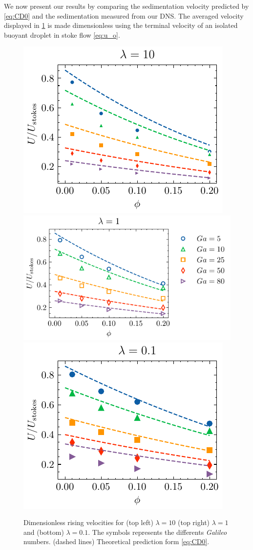 We now present our results by comparing the sedimentation velocity predicted by \ref{eq:CD0} and the sedimentation measured from our DNS. 
The averaged velocity displayed in \ref{fig:drag_force} is made dimensionless using the terminal velocity of an isolated buoyant droplet in stoke flow \eqref{eq:u_o}. 
\begin{figure}[h!]
    \centering
    \includegraphics[height = 0.25\textwidth]{image/HOMOGENEOUS_final/CA/U_l_10.pdf}
    \includegraphics[height = 0.25\textwidth]{image/HOMOGENEOUS_final/CA/U_l_1.pdf}
    \includegraphics[height = 0.25\textwidth]{image/HOMOGENEOUS_final/CA/U_l_0.pdf}
    \caption{
        Dimensionless rising velocities for (top left) $\lambda  = 10$ (top right) $\lambda =1$ and (bottom) $\lambda = 0.1$. 
        The symbols represents the differents \textit{Galileo} numbers. 
        (dashed lines) Theoretical prediction form \ref{eq:CD0}. 
    }
    \label{fig:drag_force}
\end{figure}


